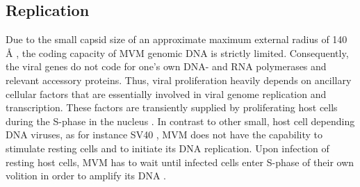
\subsection{Replication}
\label{Replication}
Due to the small capsid size of an approximate maximum external radius of 140 \r{A} \cite{pmid15299974}, the coding capacity of MVM genomic DNA is strictly limited. Consequently, the viral genes do not code for one's own DNA- and RNA polymerases and relevant accessory proteins. Thus, viral proliferation heavily depends on ancillary cellular factors that are essentially involved in viral genome replication and transcription. These factors are transiently supplied by proliferating host cells during the S-phase in the nucleus \cite{pmid16789120, pmid6602221, pmid3005655, pmid3296697, pmid9418888, pmid4673484, S-phase}. In contrast to other small, host cell depending DNA viruses, as for instance SV40 \cite{pmid4291013, pmid16578647}, MVM does not have the capability to stimulate resting cells and to initiate its DNA replication. Upon infection of resting host cells, MVM has to wait until infected cells enter S-phase of their own volition in order to amplify its DNA \cite{pmid4673484, pmid3346950, pmid10792046}.

